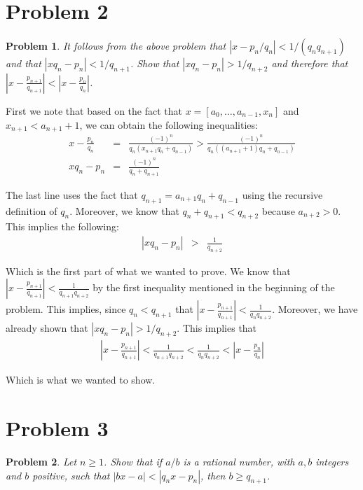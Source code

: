 \documentclass[psamsfonts]{amsart}
\newtheorem{prob}{Problem}[section]
\newenvironment{sol}{{\bfseries Solution}}{\qedsymbol}
\theoremstyle{definition}
\theoremstyle{remark}
\numberwithin{equation}{section}
\begin{document}
\section{Problem 2}

\begin{prob}
It follows from the above problem that $|x - p_n / q_n| < 1 / (q_n q_{n+1})$ and that $|x q_n - p_n | < 1 / q_{n+1}$. Show that $|x q_n - p_n | > 1 / q_{n+2}$ and therefore that $|x - \frac{p_{n+1}}{q_{n+1}}| < |x - \frac{p_n}{q_n} |$. 
\end{prob}

\begin{sol}
First we note that based on the fact that $x = [a_0, \ldots, a_{n-1}, x_n]$ and $x_{n+1} < a_{n+1} + 1$, we can obtain the following inequalities:
\begin{eqnarray}
x - \frac{p_n}{q_n} &=& \frac{(-1)^n}{q_n (x_{n+1} q_n + q_{n-1})} > \frac{(-1)^n}{q_n ((a_{n+1} + 1) q_n + q_{n-1})} \\
x q_n  - p_n &=& \frac{(-1)^n}{q_n + q_{n+1}}
\end{eqnarray}

The last line uses the fact that $q_{n+1} = a_{n+1} q_n + q_{n-1}$ using the recursive definition of $q_n$. Moreover, we know that $q_n + q_{n+1} < q_{n+2}$ because $a_{n+2} > 0$. This implies the following:
\begin{eqnarray}
|x q_n - p_n | &>& \frac{1}{q_{n+2}}
\end{eqnarray}

Which is the first part of what we wanted to prove. We know that $|x - \frac{p_{n+1}}{q_{n+1}}| < \frac{1}{q_{n+1} q_{n+2}}$ by the first inequality mentioned in the beginning of the problem. This implies, since $q_n < q_{n+1}$ that $|x - \frac{p_{n+1}}{q_{n+1}}| < \frac{1}{q_n q_{n+2}}$. Moreover, we have already shown that $|x q_n - p_n| > 1 / q_{n+2}$. This implies that
\begin{eqnarray}
\left| x - \frac{p_{n+1}}{q_{n+1}} \right| < \frac{1}{q_{n+1}q_{n+2}} < \frac{1}{q_n q_{n+2}} < \left| x - \frac{p_n}{q_n} \right|
\end{eqnarray}

Which is what we wanted to show.
\end{sol}

\section{Problem 3}

\begin{prob}
Let $n \geq 1$. Show that if $a/b$ is a rational number, with $a,b$ integers and $b$ positive, such that $|bx-a| < |q_n x - p_n|$, then $b \geq q_{n+1}$.
\end{prob}
\end{document}
